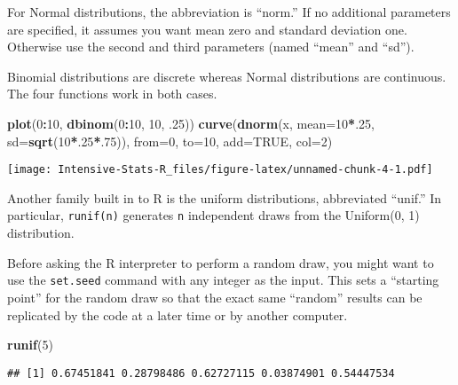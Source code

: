 \documentclass[]{book}
\newenvironment{Shaded}{\begin{snugshade}}{\end{snugshade}}
\newcommand{\DataTypeTok}[1]{\textcolor[rgb]{0.13,0.29,0.53}{#1}}
\newcommand{\DecValTok}[1]{\textcolor[rgb]{0.00,0.00,0.81}{#1}}
\newcommand{\FloatTok}[1]{\textcolor[rgb]{0.00,0.00,0.81}{#1}}
\newcommand{\KeywordTok}[1]{\textcolor[rgb]{0.13,0.29,0.53}{\textbf{#1}}}
\newcommand{\NormalTok}[1]{#1}
\newcommand{\OperatorTok}[1]{\textcolor[rgb]{0.81,0.36,0.00}{\textbf{#1}}}
\newcommand{\OtherTok}[1]{\textcolor[rgb]{0.56,0.35,0.01}{#1}}
\theoremstyle{definition}
\theoremstyle{definition}
\theoremstyle{definition}
\theoremstyle{remark}
\begin{document}
For Normal distributions, the abbreviation is ``norm.'' If no additional
parameters are specified, it assumes you want mean zero and standard
deviation one. Otherwise use the second and third parameters (named
``mean'' and ``sd'').

Binomial distributions are discrete whereas Normal distributions are
continuous. The four functions work in both cases.

\begin{Shaded}
\begin{Highlighting}[]
\KeywordTok{plot}\NormalTok{(}\DecValTok{0}\OperatorTok{:}\DecValTok{10}\NormalTok{, }\KeywordTok{dbinom}\NormalTok{(}\DecValTok{0}\OperatorTok{:}\DecValTok{10}\NormalTok{, }\DecValTok{10}\NormalTok{, }\FloatTok{.25}\NormalTok{))}
\KeywordTok{curve}\NormalTok{(}\KeywordTok{dnorm}\NormalTok{(x, }\DataTypeTok{mean=}\DecValTok{10}\OperatorTok{*}\NormalTok{.}\DecValTok{25}\NormalTok{, }\DataTypeTok{sd=}\KeywordTok{sqrt}\NormalTok{(}\DecValTok{10}\OperatorTok{*}\NormalTok{.}\DecValTok{25}\OperatorTok{*}\NormalTok{.}\DecValTok{75}\NormalTok{)), }\DataTypeTok{from=}\DecValTok{0}\NormalTok{, }\DataTypeTok{to=}\DecValTok{10}\NormalTok{, }\DataTypeTok{add=}\OtherTok{TRUE}\NormalTok{, }\DataTypeTok{col=}\DecValTok{2}\NormalTok{)}
\end{Highlighting}
\end{Shaded}

\texttt{[image: Intensive-Stats-R\_files/figure-latex/unnamed-chunk-4-1.pdf]}

Another family built in to R is the uniform distributions, abbreviated
``unif.'' In particular, \texttt{runif(n)} generates \texttt{n}
independent draws from the Uniform(0, 1) distribution.

Before asking the R interpreter to perform a random draw, you might want
to use the \texttt{set.seed} command with any integer as the input. This
sets a ``starting point'' for the random draw so that the exact same
``random'' results can be replicated by the code at a later time or by
another computer.

\begin{Shaded}
\begin{Highlighting}[]
\KeywordTok{runif}\NormalTok{(}\DecValTok{5}\NormalTok{)}
\end{Highlighting}
\end{Shaded}

\begin{verbatim}
## [1] 0.67451841 0.28798486 0.62727115 0.03874901 0.54447534
\end{verbatim}
\end{document}
